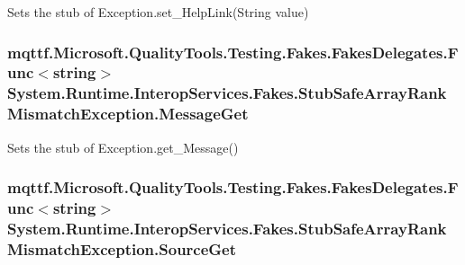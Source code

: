 Sets the stub of Exception.\-set\-\_\-\-Help\-Link(\-String value)

\hypertarget{class_system_1_1_runtime_1_1_interop_services_1_1_fakes_1_1_stub_safe_array_rank_mismatch_exception_a8b3ce912b1e991d5ccc8f0d623b7b141}{
\subsubsection[{Message\-Get}]{\setlength{\rightskip}{0pt plus 5cm}mqttf.\-Microsoft.\-Quality\-Tools.\-Testing.\-Fakes.\-Fakes\-Delegates.\-Func$<$string$>$ System.\-Runtime.\-Interop\-Services.\-Fakes.\-Stub\-Safe\-Array\-Rank\-Mismatch\-Exception.\-Message\-Get}}\label{class_system_1_1_runtime_1_1_interop_services_1_1_fakes_1_1_stub_safe_array_rank_mismatch_exception_a8b3ce912b1e991d5ccc8f0d623b7b141}


Sets the stub of Exception.\-get\-\_\-\-Message()

\hypertarget{class_system_1_1_runtime_1_1_interop_services_1_1_fakes_1_1_stub_safe_array_rank_mismatch_exception_aa21192754b355c7292e1b05cca138a12}{
\subsubsection[{Source\-Get}]{\setlength{\rightskip}{0pt plus 5cm}mqttf.\-Microsoft.\-Quality\-Tools.\-Testing.\-Fakes.\-Fakes\-Delegates.\-Func$<$string$>$ System.\-Runtime.\-Interop\-Services.\-Fakes.\-Stub\-Safe\-Array\-Rank\-Mismatch\-Exception.\-Source\-Get}}\label{class_system_1_1_runtime_1_1_interop_services_1_1_fakes_1_1_stub_safe_array_rank_mismatch_exception_aa21192754b355c7292e1b05cca138a12}


